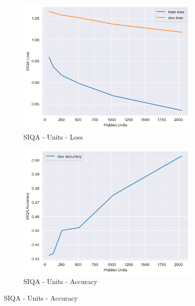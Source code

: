 \documentclass[12pt]{article}
\theoremstyle{definitionstyle}
\begin{document}
\begin{enumerate}
\begin{figure}[h!]
            \begin{subfigure}{0.45\textwidth}
                \includegraphics[width=\textwidth]{images/siqa_units_loss.png}
                \caption{SIQA - Units - Loss}
            \end{subfigure}
            \hfill
            \begin{subfigure}{0.45\textwidth}
                \includegraphics[width=\textwidth]{images/siqa_units_acc.png}
                \caption{SIQA - Units - Accuracy}
            \end{subfigure}
        

\end{figure}
\end{enumerate}
\end{document}
